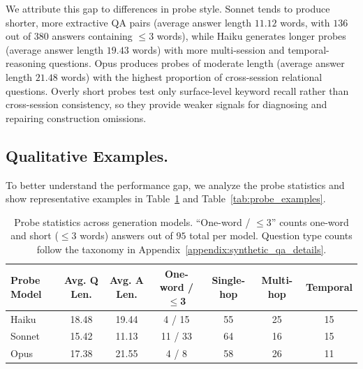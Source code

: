 We attribute this gap to differences in probe style.
Sonnet tends to produce shorter, more extractive QA pairs (average answer length $11.12$ words, with $136$ out of $380$ answers containing $\leq 3$ words), while Haiku generates longer probes (average answer length $19.43$ words) with more multi-session and temporal-reasoning questions.
Opus produces probes of moderate length (average answer length $21.48$ words) with the highest proportion of cross-session relational questions.
Overly short probes test only surface-level keyword recall rather than cross-session consistency, so they provide weaker signals for diagnosing and repairing construction omissions.

\subsection{Qualitative Examples.}
To better understand the performance gap, we analyze the probe statistics and show representative examples in Table~\ref{tab:probe_statistics} and Table~\ref{tab:probe_examples}.

\begin{table}[h]
\centering
\small
\caption{Probe statistics across generation models. ``One-word / $\leq$3'' counts one-word and short ($\leq 3$ words) answers out of $95$ total per model. Question type counts follow the taxonomy in Appendix~\ref{appendix:synthetic_qa_details}.}
\label{tab:probe_statistics}
\begin{tabular}{lcccccc}
\toprule
\textbf{Probe Model} & \textbf{Avg. Q Len.} & \textbf{Avg. A Len.} & \textbf{One-word / $\leq$3} & \textbf{Single-hop} & \textbf{Multi-hop} & \textbf{Temporal} \\
\midrule
Haiku   & 18.48 & 19.44 & 4 / 15  & 55 & 25 & 15 \\
Sonnet  & 15.42 & 11.13 & 11 / 33 & 64 & 16 & 15 \\
Opus    & 17.38 & 21.55 & 4 / 8   & 58 & 26 & 11 \\
\bottomrule
\end{tabular}
\end{table}

